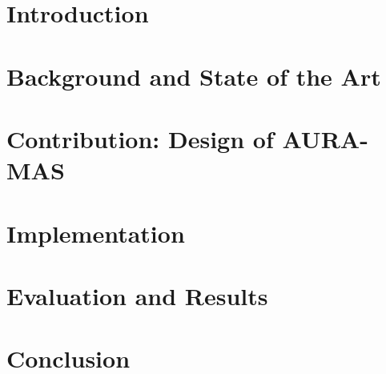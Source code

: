 \documentclass[openany,12pt,oneside]{extreport}
\begin{document}
\tableofcontents
\listoffigures
\listoftables
\printglossary[type=\acronymtype, title=Acronyms]
\clearpage

\part{Introduction}


\part{Background and State of the Art}




\part{Contribution: Design of AURA-MAS}


\part{Implementation}


\part{Evaluation and Results}


\part{Conclusion}


\printbibliography[heading=bibintoc, title={References}]
\end{document}
